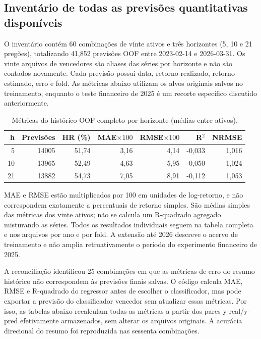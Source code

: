 \subsection{Inventário de todas as previsões quantitativas disponíveis}

O inventário contém 60 combinações de vinte ativos e três horizontes (5, 10 e 21 pregões), totalizando 41,852 previsões OOF entre 2023-02-14 e 2026-03-31. Os vinte arquivos de vencedores são aliases das séries por horizonte e não são contados novamente. Cada previsão possui data, retorno realizado, retorno estimado, erro e fold. As métricas abaixo utilizam os alvos originais salvos no treinamento, enquanto o teste financeiro de 2025 é um recorte específico discutido anteriormente.

\begin{table}[H]\centering
\caption{Métricas do histórico OOF completo por horizonte (médias entre ativos).}
{\footnotesize\begin{tabular}{rrrrrrr}\hline
h & Previsões & HR (\%) & MAE$\times100$ & RMSE$\times100$ & R$^2$ & NRMSE\\ \hline
5 & 14005 & 51,74 & 3,16 & 4,14 & -0,033 & 1,016\\
10 & 13965 & 52,49 & 4,63 & 5,95 & -0,050 & 1,024\\
21 & 13882 & 54,73 & 7,05 & 8,91 & -0,112 & 1,053\\
\hline\end{tabular}}\par{}\end{table}

MAE e RMSE estão multiplicados por 100 em unidades de log-retorno, e não correspondem exatamente a percentuais de retorno simples. São médias simples das métricas dos vinte ativos; não se calcula um R-quadrado agregado misturando as séries. Todos os resultados individuais seguem na tabela completa e nos arquivos por ano e por fold. A extensão até 2026 descreve o acervo de treinamento e não amplia retroativamente o período do experimento financeiro de 2025.

A reconciliação identificou 25 combinações em que as métricas de erro do resumo histórico não correspondem às previsões finais salvas. O código calcula MAE, RMSE e R-quadrado do regressor antes de escolher o classificador, mas pode exportar a previsão do classificador vencedor sem atualizar essas métricas. Por isso, as tabelas abaixo recalculam todas as métricas a partir dos pares y-real/y-pred efetivamente armazenados, sem alterar os arquivos originais. A acurácia direcional do resumo foi reproduzida nas sessenta combinações.

